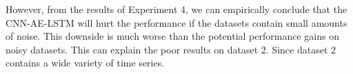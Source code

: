 However, from the results of Experiment 4, we can empirically conclude that the CNN-AE-LSTM will
hurt the performance if the datasets contain small amounts of noise. This downside is much
worse than the potential performance gains on noisy datasets.
This can explain the poor results on dataset 2. Since dataset 2 contains a wide variety
of time series.




